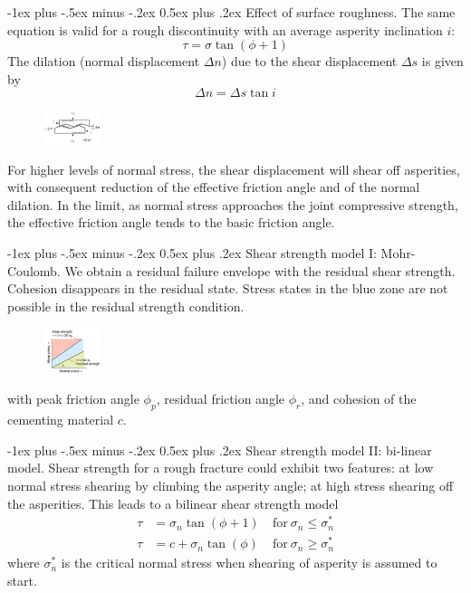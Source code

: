 \documentclass[10pt,landscape,a4paper]{article}
\makeatletter
\renewcommand{\section}{\@startsection{section}{1}{0mm}%
	{-1ex plus -.5ex minus -.2ex}%
	{0.5ex plus .2ex}%
	{\normalfont\large\bfseries}}
\makeatother
\begin{document}
\begin{multicols}{3}
	\section{Effect of surface roughness.}
	The same equation is valid for a rough discontinuity with an average asperity inclination $i$:
	\[
		\tau=\sigma\tan(\phi+1)
	\]
	The dilation (normal displacement $\Delta n$) due to the shear displacement $\Delta s$ is given by
	\[
		\Delta n=\Delta s\tan i
	\]
	\begin{figure}[H]
		\centering
		\includegraphics[width=0.15\textwidth]{surface-roughness}
	\end{figure}
	For higher levels of normal stress, the shear displacement will shear off asperities, with consequent reduction of the effective friction angle and of the normal dilation.
	In the limit, as normal stress approaches the joint compressive strength, the effective friction angle tends to the basic friction angle.
	
	\section{Shear strength model I: Mohr-Coulomb.}
	We obtain a residual failure envelope with the residual shear strength.
	Cohesion disappears in the residual state.
	Stress states in the blue zone are not possible in the residual strength condition.
	\begin{figure}[H]
		\centering
		\includegraphics[width=0.15\textwidth]{residual-failure-envelope}
	\end{figure}
	with peak friction angle $\phi_p$, residual friction angle $\phi_r$, and cohesion of the cementing material $c$.
	
	\section{Shear strength model II: bi-linear model.}
	Shear strength for a rough fracture could exhibit two features: at low normal stress shearing by climbing the asperity angle; at high stress shearing off the asperities.
	This leads to a bilinear shear strength model
	\begin{align*}
		\tau & =\sigma_n\tan(\phi+1) & \ \text{for} \ \sigma_n\leq\sigma_n^\ast \\
		\tau & =c+\sigma_n\tan(\phi) & \ \text{for} \ \sigma_n\geq\sigma_n^\ast
	\end{align*}
	where $\sigma_n^\ast$ is the critical normal stress when shearing of asperity is assumed to start.
	

\end{multicols}
\end{document}
